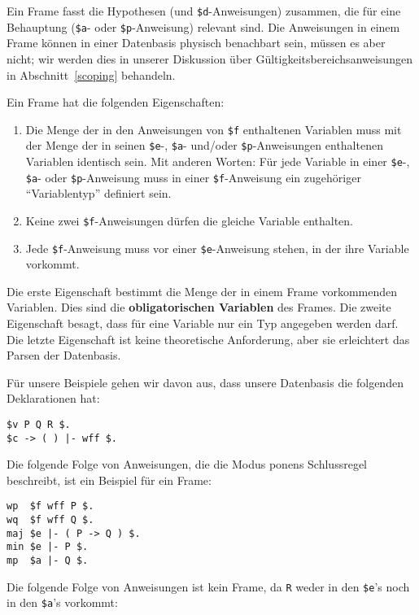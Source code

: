 Ein Frame fasst die Hypothesen (und \texttt{\$d}-Anweisungen) zusammen, die für eine Behauptung (\texttt{\$a}- oder \texttt{\$p}-Anweisung) relevant sind.  Die Anweisungen in einem Frame können in einer Datenbasis physisch benachbart sein, müssen es aber nicht; wir werden dies in unserer Diskussion über Gültigkeitsbereichsanweisungen in Abschnitt~\ref{scoping} behandeln.

Ein Frame hat die folgenden Eigenschaften:
\begin{enumerate}
 \item Die Menge der in den Anweisungen von \texttt{\$f} enthaltenen Variablen muss mit der Menge der in seinen \texttt{\$e}-, \texttt{\$a}- und/oder \texttt{\$p}-Anweisungen enthaltenen Variablen identisch sein.  Mit anderen Worten: Für jede Variable in einer \texttt{\$e}-, \texttt{\$a}- oder \texttt{\$p}-Anweisung muss in einer \texttt{\$f}-Anweisung ein zugehöriger "`Variablentyp"' definiert sein.
  \item Keine zwei \texttt{\$f}-Anweisungen dürfen die gleiche Variable enthalten.
  \item Jede \texttt{\$f}-Anweisung muss vor einer \texttt{\$e}-Anweisung stehen, in der ihre Variable vorkommt.
\end{enumerate}

Die erste Eigenschaft bestimmt die Menge der in einem Frame vorkommenden Variablen. Dies sind die {\bf obligatorischen Variablen} des Frames.  Die zweite Eigenschaft besagt, dass für eine Variable nur ein Typ angegeben werden darf. Die letzte Eigenschaft ist keine theoretische Anforderung, aber sie erleichtert das Parsen der Datenbasis.

Für unsere Beispiele gehen wir davon aus, dass unsere Datenbasis die folgenden Deklarationen hat:

\begin{verbatim}
$v P Q R $.
$c -> ( ) |- wff $.
\end{verbatim}

Die folgende Folge von Anweisungen, die die Modus ponens Schlussregel beschreibt, ist ein Beispiel für ein Frame: 

\begin{verbatim}
wp  $f wff P $.
wq  $f wff Q $.
maj $e |- ( P -> Q ) $.
min $e |- P $.
mp  $a |- Q $.
\end{verbatim}

Die folgende Folge von Anweisungen ist kein Frame, da \texttt{R} weder in den \texttt{\$e}'s noch in den \texttt{\$a}'s vorkommt:

